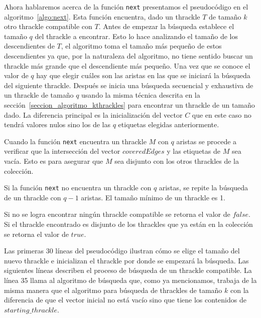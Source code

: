   Ahora hablaremos acerca de la función \texttt{next} presentamos el pseudocódigo en el algoritmo~\ref{algo:next}. Esta función encuentra, dado un thrackle $T$ de tamaño $k$ otro thrackle compatible con $T$. Antes de empezar la búsqueda establece el tamaño $q$ del thrackle a encontrar. Esto lo hace analizando el tamaño de los descendientes de $T$, el algoritmo toma el tamaño más pequeño de estos descendientes ya que, por la  naturaleza del algoritmo, no tiene sentido buscar un thrackle más grande que el descendiente más pequeño. Una vez que se conoce el valor de $q$ hay que elegir cuáles son las aristas en las que se iniciará la búsqueda del siguiente thrackle. Después se inicia una búsqueda secuencial y exhaustiva de un thrackle de tamaño $q$ usando la misma técnica descrita en la sección~\ref{seccion_algoritmo_kthrackles} para encontrar un thrackle de un tamaño dado. La diferencia principal es la inicialización del vector $C$ que en este caso no tendrá valores nulos sino los de las $q$ etiquetas elegidas anteriormente.

  Cuando la función \texttt{next} encuentra un thrackle $M$ con $q$ aristas se procede a verificar
  que la intersección del vector $coveredEdges$ y las etiquetas de $M$ sea vacía. Esto es para asegurar que
  $M$ sea disjunto con los otros thrackles de la colección.

  Si la función \texttt{next} no encuentra un thrackle con $q$ aristas, se repite la búsqueda de un
  thrackle con $q-1$ aristas. El tamaño mínimo de un thrackle es 1.

  Si no se logra encontrar ningún thrackle compatible se retorna el valor de $false$. Si el
  thrackle encontrado es disjunto de los thrackles que ya están en la colección se retorna el valor
  de $true$.

  Las primeras 30 líneas del pseudocódigo ilustran cómo se elige el tamaño del nuevo thrackle e inicializan el thrackle por donde se empezará la búsqueda. Las siguientes líneas describen el proceso de búsqueda de un thrackle compatible. La línea 35 llama al algoritmo de búsqueda que, como ya mencionamos, trabaja de la misma manera que el algoritmo para búsqueda de thrackles de tamaño $k$ con la diferencia de que el vector inicial no está vacío sino que tiene los contenidos de $starting\_thrackle$.

